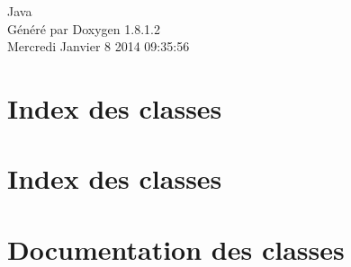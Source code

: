 \documentclass{book}
\begin{document}
\hypersetup{pageanchor=false,citecolor=blue}
\begin{titlepage}
\vspace*{7cm}
\begin{center}
{\Large Java }\\
\vspace*{1cm}
{\large Généré par Doxygen 1.8.1.2}\\
\vspace*{0.5cm}
{\small Mercredi Janvier 8 2014 09:35:56}\\
\end{center}
\end{titlepage}
\clearemptydoublepage
{}
\tableofcontents
\clearemptydoublepage
{}
\hypersetup{pageanchor=true,citecolor=blue}
\chapter{Index des classes}

\chapter{Index des classes}

\chapter{Documentation des classes}









































\printindex
\end{document}
